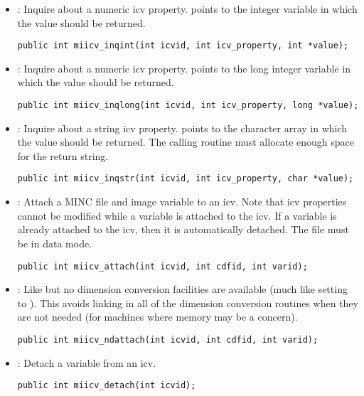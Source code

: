 \documentclass{article}
\begin{document}
\begin{itemize}
\item {} : Inquire about a numeric icv property.
 points to the integer variable in which the
value should be returned. 
\begin{verbatim}
public int miicv_inqint(int icvid, int icv_property, int *value);
\end{verbatim}

\item {} : Inquire about a numeric icv property.
 points to the long integer variable in which the
value should be returned. 
\begin{verbatim}
public int miicv_inqlong(int icvid, int icv_property, long *value);
\end{verbatim}

\item {} : Inquire about a string icv property. 
points to the character array in which the value should be returned. The
calling routine must allocate enough space for the return string.
\begin{verbatim}
public int miicv_inqstr(int icvid, int icv_property, char *value);
\end{verbatim}

\item {} : Attach a MINC file and image variable to
an icv. Note that icv properties cannot be modified while a variable
is attached to the icv. If a variable is already attached to the icv,
then it is automatically detached. The file  must be in
data mode.
\begin{verbatim}
public int miicv_attach(int icvid, int cdfid, int varid);
\end{verbatim}

\item {} : Like  but no
dimension conversion facilities are available (much like setting
 to ). This avoids linking in
all of the dimension conversion routines when they are not needed (for
machines where memory may be a concern).
\begin{verbatim}
public int miicv_ndattach(int icvid, int cdfid, int varid);
\end{verbatim}

\item {} : Detach a variable from an icv.
\begin{verbatim}
public int miicv_detach(int icvid);
\end{verbatim}


\end{itemize}
\end{document}
